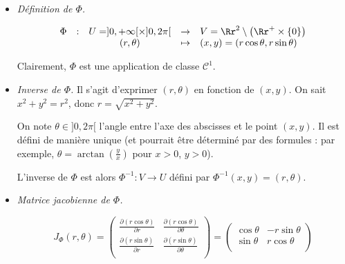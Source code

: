 \documentclass[11pt, class=report,crop=false]{standalone}
\begin{document}
\begin{itemize}
    \item \emph{Définition de $\Phi$.}

$$\begin{array}{ccccl}\Phi &:&U=]0,+\infty [\times ]0,2\pi [
&\to&V=\Rr^2\setminus \left(\Rr^+\times\{0\}\right)\\
&&(r,\theta)&\mapsto &(x,y)=(r\cos\theta, r \sin\theta)
\end{array}$$
  
Clairement, $\Phi$ est une application de classe $\mathcal{C}^1$.
   
\begin{center} 
\begin{minipage}{0.3\textwidth}      
\end{minipage}\qquad\qquad
\begin{minipage}{0.55\textwidth}  
\end{minipage}  
\end{center}
   
  \item \emph{Inverse de $\Phi$.}    
  Il s'agit d'exprimer $(r,\theta)$ en fonction de $(x,y)$.
  On sait $x^2+y^2 = r^2$, donc $r = \sqrt{x^2+y^2}$.
  
  On note $\theta \in ]0,2\pi[$ l'angle  entre l'axe des abscisses et le point $(x,y)$. Il est défini de manière unique (et pourrait être déterminé par des formules : par exemple, $\theta = \arctan(\frac y x)$ pour $x>0$, $y>0$).
  
  L'inverse de $\Phi$ est alors $\Phi^{-1} : V \to U$ défini par 
  $\Phi^{-1}(x,y) = (r,\theta)$.
  
  \item \emph{Matrice jacobienne de $\Phi$.}

$$J_\Phi(r,\theta)
= 
\begin{pmatrix}\frac{\partial (r\cos\theta)}{\partial r} & \frac{\partial (r\cos\theta)}{\partial \theta} \\
\frac{\partial (r\sin\theta)}{\partial r} & \frac{\partial (r\sin\theta)}{\partial \theta} \\
\end{pmatrix}
= 
\begin{pmatrix}
\cos \theta &-r\sin \theta \\
\sin \theta &r\cos \theta \\
\end{pmatrix}$$
  

\end{itemize}
\end{document}

